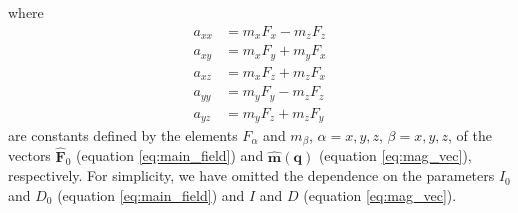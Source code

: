 where
\begin{equation}
\begin{split}
a_{xx} &= m_{x} F_{x} - m_{z} F_{z} \\
a_{xy} &= m_{x} F_{y} + m_{y} F_{x} \\
a_{xz} &= m_{x} F_{z} + m_{z} F_{x} \\
a_{yy} &= m_{y} F_{y} - m_{z} F_{z} \\
a_{yz} &= m_{y} F_{z} + m_{z} F_{y}
\end{split}
\label{eq:a-coefficients}
\end{equation}
are constants defined by the elements $F_{\alpha}$ and $m_{\beta}$, 
$\alpha = x, y, z$, $\beta = x, y, z$, 
of the vectors $\hat{\mathbf{F}}_{0}$ (equation \ref{eq:main_field}) and
$\hat{\mathbf{m}}(\mathbf{q})$ (equation \ref{eq:mag_vec}), respectively.
For simplicity, we have omitted the dependence on the 
parameters $I_{0}$ and $D_{0}$ (equation \ref{eq:main_field}) and 
$I$ and $D$ (equation \ref{eq:mag_vec}).

